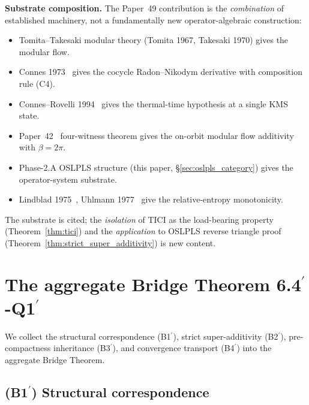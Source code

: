\documentclass[11pt,a4paper]{article}
\theoremstyle{plain}
\theoremstyle{definition}
\begin{document}
\textbf{Substrate composition.} The Paper~49 contribution is the
\emph{combination} of established machinery, not a fundamentally new
operator-algebraic construction:
\begin{itemize}
\item Tomita--Takesaki modular theory (Tomita 1967, Takesaki 1970)
gives the modular flow.
\item Connes 1973~\cite{connes1973} gives the cocycle Radon--Nikodym
derivative with composition rule (C4).
\item Connes--Rovelli 1994~\cite{connes_rovelli1994} gives the
thermal-time hypothesis at a single KMS state.
\item Paper~42~\cite{paper42} four-witness theorem gives the on-orbit
modular flow additivity with $\beta=2\pi$.
\item Phase-2.A OSLPLS structure (this paper,
\S\ref{sec:oslpls_category}) gives the operator-system substrate.
\item Lindblad 1975~\cite{lindblad1975}, Uhlmann
1977~\cite{uhlmann1977} give the relative-entropy monotonicity.
\end{itemize}
The substrate is cited; the \emph{isolation} of TICI as the
load-bearing property (Theorem~\ref{thm:tici}) and the
\emph{application} to OSLPLS reverse triangle proof
(Theorem~\ref{thm:strict_super_additivity}) is new content.

\section{The aggregate Bridge Theorem 6.4$^{\prime}$-Q1$^{\prime}$}
\label{sec:bridge_theorem}

We collect the structural correspondence (B1$^{\prime}$), strict
super-additivity (B2$^{\prime}$), pre-compactness inheritance
(B3$^{\prime}$), and convergence transport (B4$^{\prime}$) into the
aggregate Bridge Theorem.

\subsection{(B1$^{\prime}$) Structural correspondence}
\label{sec:b1prime}
\end{document}

